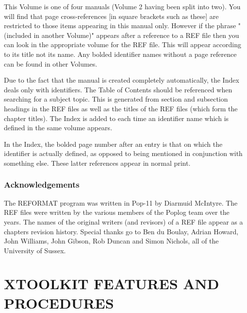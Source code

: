 This Volume is one of four manuals (Volume 2 having been split into
two). You will find that page cross-references [in square brackets such
as these] are restricted to those items appearing in this manual only.
However if the phrase "(included in another Volume)" appears after a
reference to a REF file then you can look in the appropriate volume for
the REF file. This will appear according to its title not its name.
	Any bolded identifier names without a page reference can be found in
other Volumes.


Due to the fact that the manual is created completely automatically, the
Index deals only with identifiers. The Table of Contents should be
referenced when searching for a subject topic. This is generated from
section and subsection headings in the REF files as well as the titles
of the REF files (which form the chapter titles). The Index is added to each
time an identifier name which is defined in the same volume appears.

	 In the Index, the bolded page number after an entry is that on
which the identifier is actually defined, as opposed to being mentioned
in conjunction with something else. These latter references appear in
normal print.

\section*{Acknowledgements}

The REFORMAT program was written in Pop-11 by Diarmuid McIntyre. The REF
files were written by the various members of the Poplog team over the
years. The names of the original writers (and revisors) of a REF file
appear as a chapters revision history. Special thanks go to Ben du
Boulay, Adrian Howard, John Williams, John Gibson, Rob Duncan and Simon
Nichols, all of the University of Sussex.


\tableofcontents




\part{XTOOLKIT FEATURES AND PROCEDURES}

